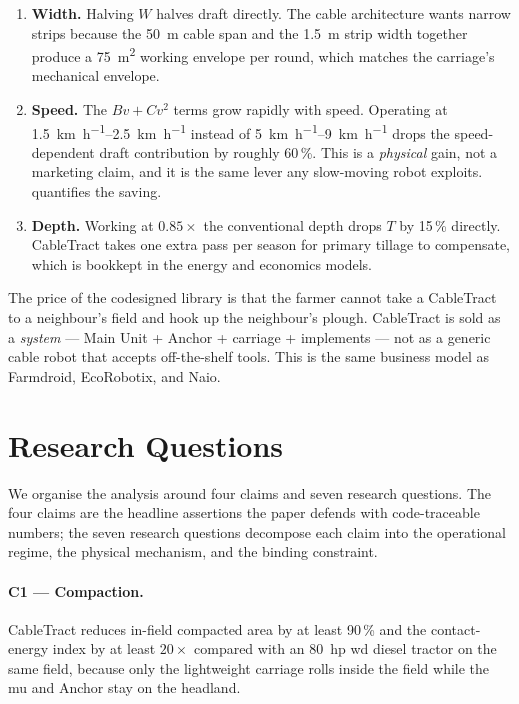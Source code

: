 \documentclass[11pt,a4paper]{article}
\begin{document}
\begin{enumerate}[leftmargin=1.6em,itemsep=0.15em]
    \item \textbf{Width.} Halving $W$ halves draft directly. The cable architecture wants narrow strips because the \SI{50}{\meter} cable span and the \SI{1.5}{\meter} strip width together produce a \SI{75}{\meter\squared} working envelope per round, which matches the carriage's mechanical envelope.
    \item \textbf{Speed.} The $B v + C v^{2}$ terms grow rapidly with speed. Operating at \SIrange{1.5}{2.5}{\kilo\meter\per\hour} instead of \SIrange{5}{9}{\kilo\meter\per\hour} drops the speed-dependent draft contribution by roughly 60\,\%. This is a \emph{physical} gain, not a marketing claim, and it is the same lever any slow-moving robot exploits.  quantifies the saving.
    \item \textbf{Depth.} Working at $0.85\times$ the conventional depth drops $T$ by 15\,\% directly. CableTract takes one extra pass per season for primary tillage to compensate, which is bookkept in the energy and economics models.
\end{enumerate}

The price of the codesigned library is that the farmer cannot take a CableTract to a neighbour's field and hook up the neighbour's plough. CableTract is sold as a \emph{system} --- Main Unit + Anchor + carriage + implements --- not as a generic cable robot that accepts off-the-shelf tools. This is the same business model as Farmdroid, EcoRobotix, and Naio.

\section{Research Questions}\label{sec:rqs}

We organise the analysis around four claims and seven research questions. The four claims are the headline assertions the paper defends with code-traceable numbers; the seven research questions decompose each claim into the operational regime, the physical mechanism, and the binding constraint.

\paragraph{C1 --- Compaction.} CableTract reduces in-field compacted area by at least 90\,\% and the contact-energy index by at least $20\times$ compared with an \SI{80}{hp} \gls{wd} diesel tractor on the same field, because only the lightweight carriage rolls inside the field while the \gls{mu} and Anchor stay on the headland.
\end{document}
